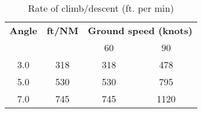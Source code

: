 {}

{}

\begin{table}[H]
    \caption{Rate of climb/descent (ft. per min)}

    \begin{center}
        \begin{tabular}{cccc}
            \toprule
            \textbf{Angle}   & \textbf{ft/NM} & \multicolumn{2}{c}{\textbf{Ground speed (knots)}}
            \\\cmidrule(lr){3-4}
                             &                & 60                                                & 90   \\
            \midrule
            3.0\textdegree{} & 318            & 318                                               & 478  \\
            5.0\textdegree{} & 530            & 530                                               & 795  \\
            7.0\textdegree{} & 745            & 745                                               & 1120 \\
            \bottomrule
        \end{tabular}
    \end{center}
\end{table}

{}

